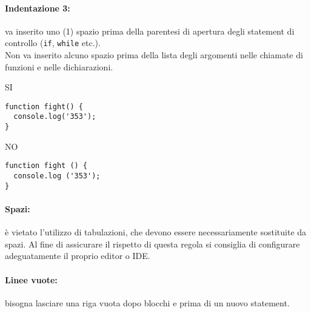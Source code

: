 \documentclass[../ProcessiPrimari.tex]{subfiles}
\begin{document}
\paragraph*{Indentazione 3: }
va inserito uno (1) spazio prima della parentesi di apertura degli statement di controllo (\texttt{if}, \texttt{while} etc.). \\
Non va inserito alcuno spazio prima della lista degli argomenti nelle chiamate di funzioni e nelle dichiarazioni.\\

\begin{center}{
\begin{minipage}{5cm}
{\begin{center}SI\end{center}}
\begin{Verbatim}[frame=single]
function fight() {
  console.log('353');
}
\end{Verbatim}
\end{minipage}
\hfil
\begin{minipage}{5cm}
{\begin{center}NO\end{center}}
\begin{Verbatim}[frame=single]
function fight () {
  console.log ('353');
}
\end{Verbatim}
\end{minipage}
}
\end{center}


\paragraph*{Spazi: }
è vietato l'utilizzo di tabulazioni, che devono essere necessariamente sostituite da spazi. Al fine di assicurare il rispetto di questa regola si consiglia di configurare adeguatamente il proprio editor o IDE.
\paragraph*{Linee vuote: }
bisogna lasciare una riga vuota dopo blocchi e prima di un nuovo statement.
\end{document}
